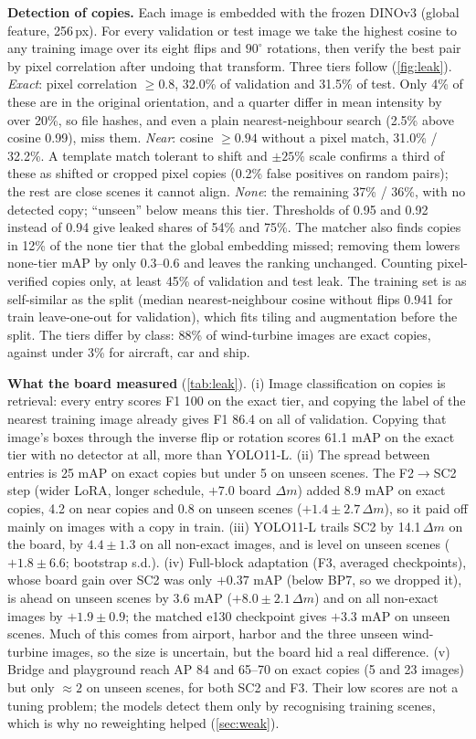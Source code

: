 \documentclass[10pt,twocolumn,letterpaper]{article}
\newcommand{\dm}{\ensuremath{\Delta m}}
\begin{document}
\textbf{Detection of copies.} Each image is embedded with the frozen DINOv3 (global feature, 256\,px). For every validation or test image we take the highest cosine to any training image over its eight flips and $90^\circ$ rotations, then verify the best pair by pixel correlation after undoing that transform. Three tiers follow (\cref{fig:leak}). \emph{Exact}: pixel correlation ${\ge}0.8$, 32.0\% of validation and 31.5\% of test. Only 4\% of these are in the original orientation, and a quarter differ in mean intensity by over 20\%, so file hashes, and even a plain nearest-neighbour search (2.5\% above cosine 0.99), miss them. \emph{Near}: cosine ${\ge}0.94$ without a pixel match, 31.0\% / 32.2\%. A template match tolerant to shift and $\pm25\%$ scale confirms a third of these as shifted or cropped pixel copies (0.2\% false positives on random pairs); the rest are close scenes it cannot align. \emph{None}: the remaining 37\% / 36\%, with no detected copy; ``unseen'' below means this tier. Thresholds of 0.95 and 0.92 instead of 0.94 give leaked shares of 54\% and 75\%. The matcher also finds copies in 12\% of the none tier that the global embedding missed; removing them lowers none-tier mAP by only 0.3--0.6 and leaves the ranking unchanged. Counting pixel-verified copies only, at least 45\% of validation and test leak. The training set is as self-similar as the split (median nearest-neighbour cosine without flips 0.941 for train leave-one-out  for validation), which fits tiling and augmentation before the split. The tiers differ by class: 88\% of wind-turbine images are exact copies, against under 3\% for aircraft, car and ship.

\textbf{What the board measured} (\cref{tab:leak}). (i) Image classification on copies is retrieval: every entry scores F1 100 on the exact tier, and copying the label of the nearest training image already gives F1 86.4 on all of validation. Copying that image's boxes through the inverse flip or rotation scores 61.1 mAP on the exact tier with no detector at all, more than YOLO11-L. (ii) The spread between entries is 25 mAP on exact copies but under 5 on unseen scenes. The F2$\to$SC2 step (wider LoRA, longer schedule, $+7.0$ board \dm) added 8.9 mAP on exact copies, 4.2 on near copies and 0.8 on unseen scenes ($+1.4{\pm}2.7$\,\dm), so it paid off mainly on images with a copy in train. (iii) YOLO11-L trails SC2 by 14.1\,\dm{} on the board, by $4.4{\pm}1.3$ on all non-exact images, and is level on unseen scenes ($+1.8{\pm}6.6$; bootstrap s.d.). (iv) Full-block adaptation (F3, averaged checkpoints), whose board gain over SC2 was only $+0.37$ mAP (below BP7, so we dropped it), is ahead on unseen scenes by 3.6 mAP ($+8.0{\pm}2.1$\,\dm) and on all non-exact images by $+1.9{\pm}0.9$; the matched e130 checkpoint gives $+3.3$ mAP on unseen scenes. Much of this comes from airport, harbor and the three unseen wind-turbine images, so the size is uncertain, but the board hid a real difference. (v) Bridge and playground reach AP 84 and 65--70 on exact copies (5 and 23 images) but only ${\approx}2$ on unseen scenes, for both SC2 and F3. Their low scores are not a tuning problem; the models detect them only by recognising training scenes, which is why no reweighting helped (\cref{sec:weak}).
\end{document}
